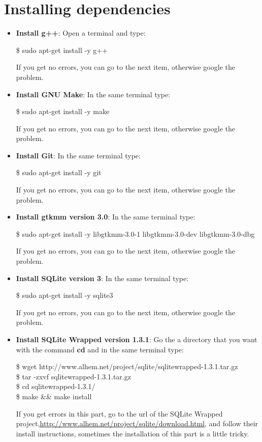 \documentclass[pdftex,11pt,a4paper,titlepage]{report}
\begin{document}
\section{Installing dependencies}
\begin{itemize}
\item \textbf{Install g++}: Open a terminal and type:
\begin{frame}
\$ sudo apt-get install -y g++
\end{frame}
If you get no errors, you can go to the next item, otherwise google the problem.

\item \textbf{Install GNU Make}: In the same terminal type:
\begin{frame}
\$ sudo apt-get install -y make
\end{frame}
If you get no errors, you can go to the next item, otherwise google the problem.

\item \textbf{Install Git}: In the same terminal type:
\begin{frame}
\$ sudo apt-get install -y git
\end{frame}
If you get no errors, you can go to the next item, otherwise google the problem.

\item \textbf{Install gtkmm version 3.0}: In the same terminal type:
\begin{framed}
\$ sudo apt-get install -y libgtkmm-3.0-1 libgtkmm-3.0-dev libgtkmm-3.0-dbg
\end{framed}
If you get no errors, you can go to the next item, otherwise google the problem.

\item \textbf{Install SQLite version 3}: In the same terminal type:
\begin{framed}
\$ sudo apt-get install -y sqlite3
\end{framed}
If you get no errors, you can go to the next item, otherwise google the problem.

\item \textbf{Install SQLite Wrapped version 1.3.1}: Go the a directory that you want with the command \textbf{cd} and in the same terminal type:
\begin{framed}
\$ wget http://www.alhem.net/project/sqlite/sqlitewrapped-1.3.1.tar.gz \\
\$ tar -zxvf sqlitewrapped-1.3.1.tar.gz \\
\$ cd sqlitewrapped-1.3.1/ \\
\$ make \&\& make install
\end{framed}
If you get errors in this part, go to the url of the SQLite Wrapped project,\url{http://www.alhem.net/project/sqlite/download.html}, and follow their install instructions, sometimes the installation of this part is a little tricky. 


\end{itemize}
\end{document}
